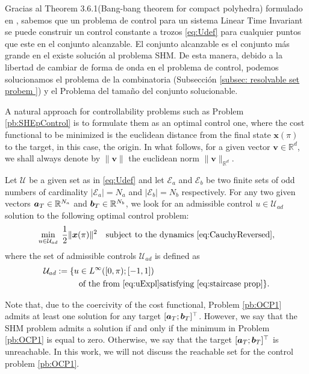 \documentclass[twocolumn]{autart}    %
\begin{document}
\JOStart
Gracias al Theorem 3.6.1(Bang-bang theorem for compact polyhedra) formulado en \cite[Chapter~2.7]{schattler2012geometric}, sabemos que un problema de control para un sistema Linear Time Invariant  se puede construir un control constante a trozos \eqref{eq:Udef} para cualquier puntos que este en el conjunto alcanzable. El conjunto alcanzable es el conjunto más grande en el existe solución al problema SHM. De esta manera, debido a la libertad de cambiar de forma de onda en el problema de control, podemos solucionamos el problema de la combinatoria (Subsección \ref{subsec: resolvable set probem }) y el Problema del tamaño del conjunto solucionable. 
\JOEnd

A natural approach for controllability problems such as Problem \ref{pb:SHEpControl} is to formulate them as an optimal control one, where the cost functional to be minimized is the euclidean distance from the final state $\bm{x}(\pi)$ to the target, in this case, the origin. In what follows, for a given vector $\bm{v}\in\mathbb{R}^d$, we shall always denote by $\|\bm{v}\|$ the euclidean norm $\|\bm{v}\|_{\mathbb{R}^d}$.
\newline

\begin{problem}\label{pb:OCP1}
Let $\mathcal{U}$ be a given set as in \eqref{eq:Udef} and let $\mathcal{E}_a $ and $\mathcal{E} _b $ be two finite sets of odd numbers of cardinality $|\mathcal{E}_a| = N_a $ and $ |\mathcal{E} _b| = N_b$ respectively. For any two given vectors $\bm{a}_T \in \mathbb{R}^{N_a}$ and $\bm{b}_T \in \mathbb{R}^{N_b} $, we look for an admissible control $u\in \mathcal{U}_{ad}$ solution to the following optimal control problem:
\begin{equation*}
	\min_{u \in \mathcal{U}_{ad}}\;\frac 12 \|\bm{x}(\pi)\|^2 \quad \text{subject to the dynamics \eqref{eq:CauchyReversed}},
\end{equation*}
where the set of admissible controls $\mathcal{U}_{ad}$ is defined as
\begin{align*}
	\mathcal{U}_{ad} := \{ u&\in L^\infty ([0,\pi); [-1,1]) 
	\\ 
	&\text{of the from \eqref{eq:uExpl}} \text{satisfying \eqref{eq:staircase prop}} \}.
\end{align*}
\end{problem}

\begin{remark}
Note that, due to the coercivity of the cost functional, Problem \ref{pb:OCP1} admits at least one solution for any target $[\bm{a}_T;\bm{b}_T]^\top$. However, we say that the SHM problem admits a solution if and only if the minimum in Problem \ref{pb:OCP1} is equal to zero. Otherwise, we say that the target $[\bm{a}_T;\bm{b}_T]^\top$ is unreachable. In this work, we will not discuss the reachable set for the control problem \eqref{pb:OCP1}.
\end{remark}
\end{document}
